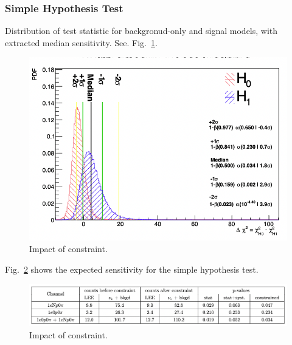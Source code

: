 \subsubsection{Simple Hypothesis Test}

Distribution of test statistic for backgronud-only and signal models, with extracted median sensitivity. See. Fig.~\ref{fig:simplehypothesis}.

\begin{center}
\begin{figure}[h]
    \includegraphics[width=1.00\textwidth]{technote/SystematicsSensitivity/Figures/simplehypothesis.png}
    \caption{Impact of constraint.}
    \label{fig:simplehypothesis} 
\end{figure}
\end{center}

Fig.~\ref{fig:simplehypothesisresults} shows the expected sensitivity for the simple hypothesis test.

\begin{center}
\begin{figure}[h]
    \includegraphics[width=1.00\textwidth]{technote/SystematicsSensitivity/Figures/simplehypothesisresults.png}
    \caption{Impact of constraint.}
    \label{fig:simplehypothesisresults} 
\end{figure}
\end{center}

